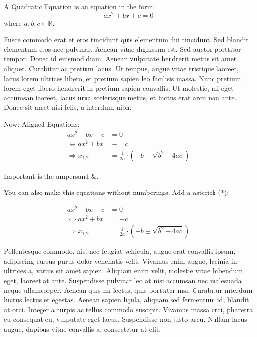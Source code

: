 \documentclass[11pt,a4paper,oneside]{report}
\begin{document}
A Quadratic Equation is an equation in the form:
\begin{equation}
    ax^2+bx+c=0
\end{equation}
where \(a,b,c\in\mathbb{R}\).

Fusce commodo erat et eros tincidunt quis elementum dui tincidunt. Sed blandit elementum eros nec pulvinar. Aenean vitae dignissim est. Sed auctor porttitor tempor. Donec id euismod diam. Aenean vulputate hendrerit metus sit amet aliquet. Curabitur ac pretium lacus. Ut tempus, augue vitae tristique laoreet, lacus lorem ultrices libero, et pretium sapien leo facilisis massa. Nunc pretium lorem eget libero hendrerit in pretium sapien convallis. Ut molestie, mi eget accumsan laoreet, lacus urna scelerisque metus, et luctus erat arcu non ante. Donec sit amet nisi felis, a interdum nibh.

Now: Aligned Equations:
\begin{align}
                    ax^2+bx+c &= 0\\
    \Leftrightarrow ax^2+bx   &= -c\\
    \Rightarrow x_{1,2} &= \frac{1}{2a} \cdot (-b \pm \sqrt{b^2 - 4ac})
\end{align}

Important is the ampersand \&.

You can also make this equations without numberings. Add a asterisk (*):

\begin{align*}
                    ax^2+bx+c &= 0\\
    \Leftrightarrow ax^2+bx   &= -c\\
    \Rightarrow x_{1,2} &= \frac{1}{2a} \cdot (-b \pm \sqrt{b^2 - 4ac})
\end{align*}

Pellentesque commodo, nisi nec feugiat vehicula, augue erat convallis ipsum, adipiscing cursus purus dolor venenatis velit. Vivamus enim augue, lacinia in ultrices a, varius sit amet sapien. Aliquam enim velit, molestie vitae bibendum eget, laoreet at ante. Suspendisse pulvinar leo at nisi accumsan nec malesuada neque ullamcorper. Aenean quis mi lectus, quis porttitor nisi. Curabitur interdum luctus lectus et egestas. Aenean sapien ligula, aliquam sed fermentum id, blandit at orci. Integer a turpis ac tellus commodo suscipit. Vivamus massa orci, pharetra eu consequat eu, vulputate eget lacus. Suspendisse non justo arcu. Nullam lacus augue, dapibus vitae convallis a, consectetur at elit.
\end{document}
